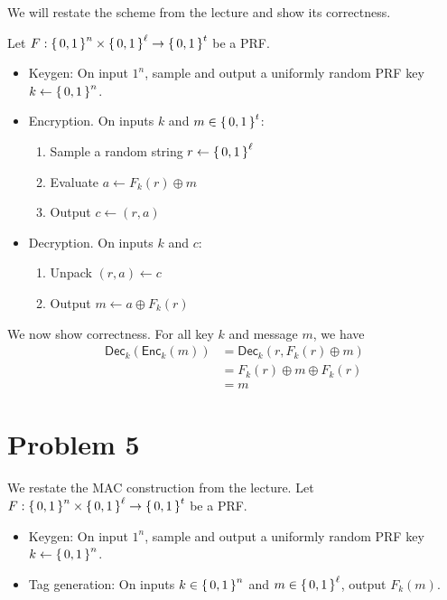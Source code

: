 \documentclass{article}
\theoremstyle{definition}
\begin{document}
We will restate the scheme from the lecture and show its correctness.

Let $F:\set{0, 1}^n\times \set{0, 1}^\ell \rightarrow \set{0, 1}^t$ be a PRF.
\begin{itemize}
    \item Keygen: On input $1^n$, sample and output a uniformly random PRF key $k\gets\set{0, 1}^n$.
    \item Encryption. On inputs $k$ and $m\in\set{0, 1}^t$: \begin{enumerate}
        \item Sample a random string $r\gets\set{0, 1}^\ell$
        \item Evaluate $a\gets F_k(r) \oplus m$
        \item Output $c\gets (r, a)$
    \end{enumerate}
    \item Decryption. On inputs $k$ and $c$: \begin{enumerate}
        \item Unpack $(r, a) \gets c$
        \item Output $m\gets a\oplus F_k(r)$
    \end{enumerate}
\end{itemize}

We now show correctness.
For all key $k$ and message $m$, we have
\begin{align*}
    \mathsf{Dec}_k(\mathsf{Enc}_k(m)) &= \mathsf{Dec}_k(r, F_k(r)\oplus m) \\
    &= F_k(r)\oplus m \oplus F_k(r) \\
    &= m
\end{align*}

\section*{Problem 5}

We restate the MAC construction from the lecture.
Let $F:\set{0, 1}^n\times \set{0, 1}^\ell \rightarrow \set{0, 1}^t$ be a PRF.
\begin{itemize}
    \item Keygen: On input $1^n$, sample and output a uniformly random PRF key $k\gets\set{0, 1}^n$.
    \item Tag generation: On inputs $k\in\set{0, 1}^n$ and $m\in\set{0, 1}^\ell$, output $F_k(m)$.
\end{itemize}
\end{document}
